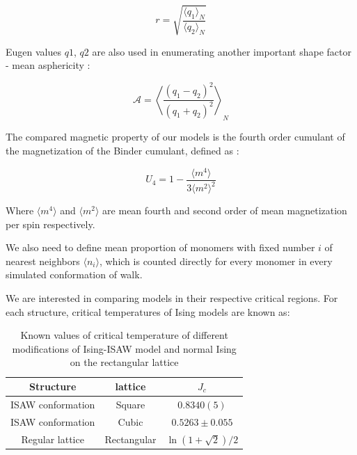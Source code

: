 \documentclass[a4paper]{jpconf}
\begin{document}
\begin{equation}
    r = \sqrt{\frac{\langle q_{1}\rangle_{N}}{\langle q_{2} \rangle_{N}}}
\end{equation}

Eugen values $q1$, $q2$ are also used in enumerating another important shape factor - mean asphericity \cite{Caracciolo2011}:

\begin{equation}
\label{eq:Asphericity}
    \mathcal{A} = \left\langle \frac{(q_{1} - q_{2})^{2}}{(q_{1} + q_{2})^{2}} \right\rangle_{N}
\end{equation}

The compared magnetic property of our models is the fourth order cumulant of the magnetization of the Binder cumulant, defined as \cite{Binder1981_Ising}:

\begin{equation}
\label{eq:Cumulant}
U_{4} = 1 - \frac{\langle m^{4} \rangle}{3 \langle m^{2} \rangle^{2}}
\end{equation}

Where $\langle m^{4} \rangle$ and $\langle m^{2} \rangle$ are mean fourth and second order of mean magnetization per spin respectively.

We also need to define mean proportion of monomers with fixed number $i$ of nearest neighbors $\langle n_{i} \rangle$, which is counted directly for every monomer in every simulated conformation of walk.

We are interested in comparing models in their respective critical regions. For each structure, critical temperatures of Ising models are known as:

\begin{table}[h]
    \centering
    \begin{tabular}{|c|c|c|}
        \hline
        Structure & lattice & $J_{c}$ \\ \hline
        ISAW conformation & Square & $0.8340(5)$\cite{faizullina2021critical} \\ \hline
        ISAW conformation & Cubic & $0.5263 \pm 0.055$\cite{Foster2021}\\ \hline
        Regular lattice & Rectangular & $\ln{(1 + \sqrt{2}) / 2}$\cite{Onsager}\\ \hline
    \end{tabular}
    \caption{Known values of critical temperature of different modifications of Ising-ISAW model and normal Ising on the rectangular lattice}
    \label{tab:Ising_T_c}
\end{table}
\end{document}
